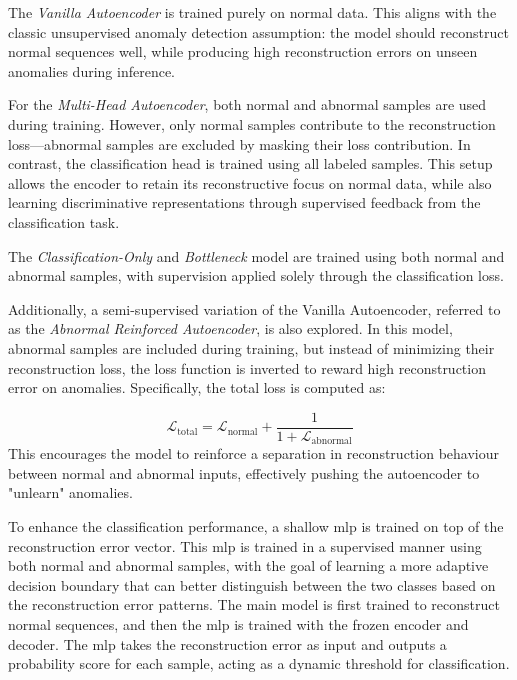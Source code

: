 The \emph{Vanilla Autoencoder} is trained purely on normal data.
This aligns with the classic unsupervised anomaly detection assumption: the model should reconstruct normal sequences well, while producing high reconstruction errors on unseen anomalies during inference.

For the \emph{Multi-Head Autoencoder}, both normal and abnormal samples are used during training.
However, only normal samples contribute to the reconstruction loss—abnormal samples are excluded by masking their loss contribution.
In contrast, the classification head is trained using all labeled samples.
This setup allows the encoder to retain its reconstructive focus on normal data, while also learning discriminative representations through supervised feedback from the classification task.

The \emph{Classification-Only} and \emph{Bottleneck} model are trained using both normal and abnormal samples, with supervision applied solely through the classification loss. 

Additionally, a semi-supervised variation of the Vanilla Autoencoder, referred to as the \emph{Abnormal Reinforced Autoencoder}, is also explored.
In this model, abnormal samples are included during training, but instead of minimizing their reconstruction loss, the loss function is inverted to reward high reconstruction error on anomalies.
Specifically, the total loss is computed as:

\begin{equation}
\label{eq:reinforced-loss}
\mathcal{L}_{\text{total}} = \mathcal{L}_{\text{normal}} + \frac{1}{1 + \mathcal{L}_{\text{abnormal}}}
\end{equation}
This encourages the model to reinforce a separation in reconstruction behaviour between normal and abnormal inputs, effectively pushing the autoencoder to "unlearn" anomalies.

To enhance the classification performance, a shallow \gls{mlp} is trained on top of the reconstruction error vector. 
This \gls{mlp} is trained in a supervised manner using both normal and abnormal samples, with the goal of learning a more adaptive decision boundary that can better distinguish between the two classes based on the reconstruction error patterns.
The main model is first trained to reconstruct normal sequences, and then the \gls{mlp} is trained with the frozen encoder and decoder. 
The \gls{mlp} takes the reconstruction error as input and outputs a probability score for each sample, acting as a dynamic threshold for classification.



